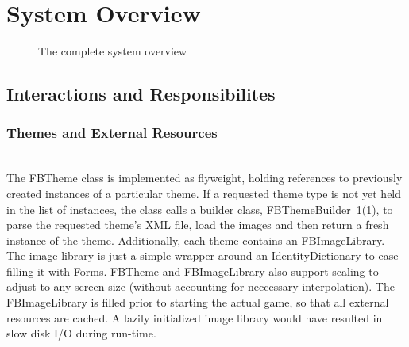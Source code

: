 \section{System Overview}
%
\begin{figure}[bt]
  \begin{center}
  \end{center}
  \caption{The complete system overview}
  \label{fig:system}
\end{figure}
%
\subsection{Interactions and Responsibilites}
\subsubsection{Themes and External Resources} ~\\
The FBTheme class is implemented as flyweight, holding references to previously 
created instances of a particular theme. If a requested theme type is not yet 
held in the list of instances, the class calls a builder class, 
FBThemeBuilder~\ref{fig:system}(1), to parse the requested theme's XML file, 
load the images and then return a fresh instance of the theme. Additionally, 
each theme contains an FBImageLibrary. The image library is just a simple 
wrapper around an IdentityDictionary to ease filling it with Forms. 
FBTheme and FBImageLibrary also support scaling to adjust to any screen 
size (without accounting for neccessary interpolation).
The FBImageLibrary is filled prior to starting the actual game, so 
that all external resources are cached. A lazily initialized image 
library would have resulted in slow disk I/O during
run-time.
